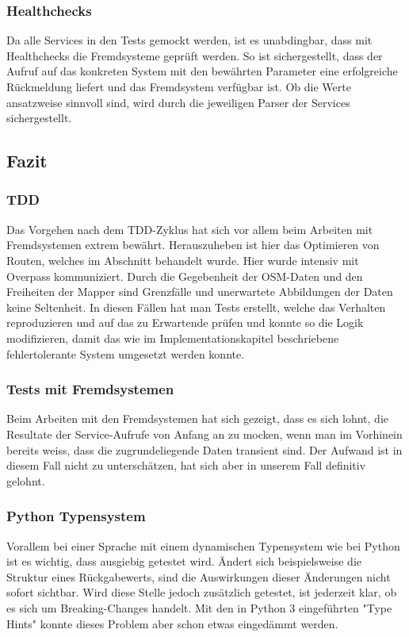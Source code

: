 \subsubsection{Healthchecks}
\label{test:Healthchecks}
Da alle Services in den Tests gemockt werden, ist es unabdingbar, dass mit Healthchecks die Fremdsysteme geprüft werden. So ist sichergestellt, dass der Aufruf auf das konkreten System mit den bewährten Parameter eine erfolgreiche Rückmeldung liefert und das Fremdsystem verfügbar ist. Ob die Werte ansatzweise sinnvoll sind, wird durch die jeweiligen Parser der Services sichergestellt.

\subsection{Fazit}
\label{test:Fazit}

\subsubsection{TDD}
\label{fazit:TDD}
Das Vorgehen nach dem \ac{TDD}-Zyklus hat sich vor allem beim Arbeiten mit Fremdsystemen extrem bewährt. Herauszuheben ist hier das Optimieren von Routen, welches im Abschnitt  behandelt wurde. Hier wurde intensiv mit Overpass \cite{wiki:overpass} kommuniziert. Durch die Gegebenheit der \ac{OSM}-Daten und den Freiheiten der Mapper sind Grenzfälle und unerwartete Abbildungen der Daten keine Seltenheit. In diesen Fällen hat man Tests erstellt, welche das Verhalten reproduzieren und auf das zu Erwartende prüfen und konnte so die Logik modifizieren, damit das wie im Implementationskapitel beschriebene fehlertolerante System umgesetzt werden konnte.

\subsubsection{Tests mit Fremdsystemen}
\label{fazit:Tests mit Fremdsystemen}
Beim Arbeiten mit den Fremdsystemen hat sich gezeigt, dass es sich lohnt, die Resultate der Service-Aufrufe von Anfang an zu mocken, wenn man im Vorhinein bereits weiss, dass die zugrundeliegende Daten transient sind. Der Aufwand ist in diesem Fall nicht zu unterschätzen, hat sich aber in unserem Fall definitiv gelohnt.

\subsubsection{Python Typensystem}
\label{fazit:Python Typesystem}
Vorallem bei einer Sprache mit einem dynamischen Typensystem wie bei Python ist es wichtig, dass ausgiebig getestet wird. Ändert sich beispielsweise die Struktur eines Rückgabewerts, sind die Auswirkungen dieser Änderungen nicht sofort sichtbar. Wird diese Stelle jedoch zusätzlich getestet, ist jederzeit klar, ob es sich um Breaking-Changes handelt. Mit den in Python 3 eingeführten "Type Hints" konnte dieses Problem aber schon etwas eingedämmt werden.
